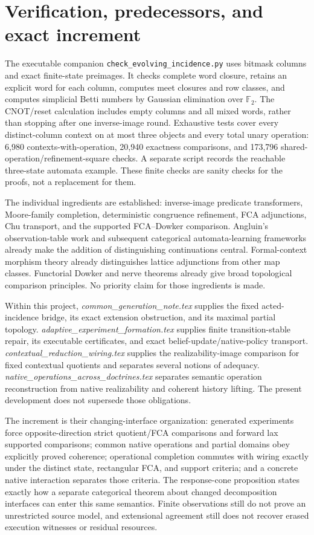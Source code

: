 \documentclass[11pt]{article}
\theoremstyle{remark}\newtheorem{remark}[theorem]{Remark}
\begin{document}
\section{Verification, predecessors, and exact increment}
The executable companion \texttt{check\_evolving\_incidence.py} uses
bitmask columns and exact finite-state preimages. It checks complete
word closure, retains an explicit word for each column, computes meet
closures and row classes, and computes simplicial Betti numbers by
Gaussian elimination over $\mathbb F_2$. The CNOT/reset calculation
includes empty columns and all mixed words, rather than stopping after
one inverse-image round. Exhaustive tests cover every distinct-column
context on at most three objects and every total unary operation:
6,980 contexts-with-operation, 20,940 exactness comparisons, and
173,796 shared-operation/refinement-square checks. A separate script
records the reachable three-state automata example. These finite checks
are sanity checks for the proofs, not a replacement for them.

The individual ingredients are established: inverse-image predicate
transformers, Moore-family completion, deterministic congruence
refinement, FCA adjunctions, Chu transport, and the supported
FCA--Dowker comparison. Angluin's observation-table work and subsequent
categorical automata-learning frameworks already make the addition of
distinguishing continuations central. Formal-context morphism theory
already distinguishes lattice adjunctions from other map classes.
Functorial Dowker and nerve theorems already give broad topological
comparison principles. No priority claim for those ingredients is made.

Within this project, \emph{common\_generation\_note.tex} supplies the
fixed acted-incidence bridge, its exact extension obstruction, and its
maximal partial topology. \emph{adaptive\_experiment\_formation.tex}
supplies finite transition-stable repair, its executable certificates,
and exact belief-update/native-policy transport.
\emph{contextual\_reduction\_wiring.tex} supplies the realizability-image
comparison for fixed contextual quotients and separates several notions
of adequacy. \emph{native\_operations\_across\_doctrines.tex} separates
semantic operation reconstruction from native realizability and coherent
history lifting. The present development does not supersede those
obligations.

The increment is their changing-interface organization: generated
experiments force opposite-direction strict quotient/FCA comparisons
and forward lax supported comparisons; common native operations and
partial domains obey explicitly proved coherence; operational completion
commutes with wiring exactly under the distinct state, rectangular
FCA, and support criteria; and a concrete native interaction separates
those criteria. The response-cone proposition states exactly how a
separate categorical theorem about changed decomposition interfaces
can enter this same semantics. Finite observations still do not prove
an unrestricted source model, and extensional agreement still does not
recover erased execution witnesses or residual resources.
\end{document}
